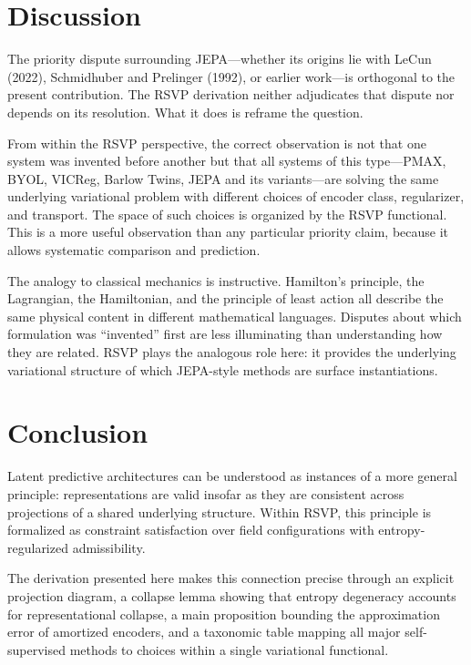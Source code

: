 \documentclass[12pt, oneside]{article}
\begin{document}
\section{Discussion}

The priority dispute surrounding JEPA---whether its origins lie with LeCun (2022), Schmidhuber and Prelinger (1992), or earlier work---is orthogonal to the present contribution. The RSVP derivation neither adjudicates that dispute nor depends on its resolution. What it does is reframe the question.

From within the RSVP perspective, the correct observation is not that one system was invented before another but that all systems of this type---PMAX, BYOL, VICReg, Barlow Twins, JEPA and its variants---are solving the same underlying variational problem with different choices of encoder class, regularizer, and transport. The space of such choices is organized by the RSVP functional. This is a more useful observation than any particular priority claim, because it allows systematic comparison and prediction.

The analogy to classical mechanics is instructive. Hamilton's principle, the Lagrangian, the Hamiltonian, and the principle of least action all describe the same physical content in different mathematical languages. Disputes about which formulation was ``invented'' first are less illuminating than understanding how they are related. RSVP plays the analogous role here: it provides the underlying variational structure of which JEPA-style methods are surface instantiations.

\section{Conclusion}
\label{sec:conclusion}

Latent predictive architectures can be understood as instances of a more general principle: representations are valid insofar as they are consistent across projections of a shared underlying structure. Within RSVP, this principle is formalized as constraint satisfaction over field configurations with entropy-regularized admissibility.

The derivation presented here makes this connection precise through an explicit projection diagram, a collapse lemma showing that entropy degeneracy accounts for representational collapse, a main proposition bounding the approximation error of amortized encoders, and a taxonomic table mapping all major self-supervised methods to choices within a single variational functional.
\end{document}
